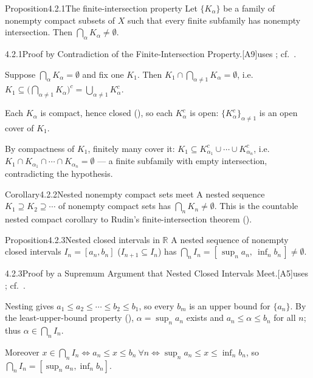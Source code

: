 \documentclass[main.tex]{subfiles}
\begin{document}
\begin{Obj}{Proposition}{4.2.1}{The finite-intersection property}
Let $\{K_\alpha\}$ be a family of nonempty compact subsets of $X$ such that every finite subfamily has
nonempty intersection. Then $\bigcap_\alpha K_\alpha\neq\emptyset$.
\end{Obj}
\begin{Prf}{4.2.1}{Proof by Contradiction of the Finite-Intersection Property.}{[A9]\quad uses ; cf.\ .}
\item Suppose $\bigcap_\alpha K_\alpha=\emptyset$ and fix one $K_1$. Then $K_1\cap\bigcap_{\alpha\neq1}
  K_\alpha=\emptyset$, i.e.\ $K_1\subseteq\big(\bigcap_{\alpha\neq1}K_\alpha\big)^c=\bigcup_{\alpha\neq1}
  K_\alpha^c$.
\item Each $K_\alpha$ is compact, hence closed (), so each $K_\alpha^c$ is open:
  $\{K_\alpha^c\}_{\alpha\neq1}$ is an open cover of $K_1$.
\item By compactness of $K_1$, finitely many cover it: $K_1\subseteq K_{\alpha_1}^c\cup\cdots\cup
  K_{\alpha_n}^c$, i.e.\ $K_1\cap K_{\alpha_1}\cap\cdots\cap K_{\alpha_n}=\emptyset$ --- a finite
  subfamily with empty intersection, contradicting the hypothesis.
\end{Prf}

\begin{Obj}{Corollary}{4.2.2}{Nested nonempty compact sets meet}
A nested sequence $K_1\supseteq K_2\supseteq\cdots$ of nonempty compact sets has
$\bigcap_n K_n\neq\emptyset$.
This is the countable nested compact corollary to Rudin's finite-intersection theorem
().
\end{Obj}

\begin{Obj}{Proposition}{4.2.3}{Nested closed intervals in $\mathbb R$}
A nested sequence of nonempty closed intervals $I_n=[a_n,b_n]$ ($I_{n+1}\subseteq I_n$) has
$\bigcap_n I_n=[\,\sup_n a_n,\ \inf_n b_n\,]\neq\emptyset$.
\end{Obj}
\begin{Prf}{4.2.3}{Proof by a Supremum Argument that Nested Closed Intervals Meet.}{[A5]\quad uses ; cf.\ .}
\item Nesting gives $a_1\le a_2\le\cdots\le b_2\le b_1$, so every $b_m$ is an upper bound for
  $\{a_n\}$. By the least-upper-bound property (), $\alpha=\sup_n a_n$ exists and
  $a_n\le\alpha\le b_n$ for all $n$; thus $\alpha\in\bigcap_n I_n$.
\item Moreover $x\in\bigcap_n I_n\iff a_n\le x\le b_n\ \forall n\iff\sup_n a_n\le x\le\inf_n b_n$, so
  $\bigcap_n I_n=[\sup_n a_n,\inf_n b_n]$.
\end{Prf}
\end{document}
